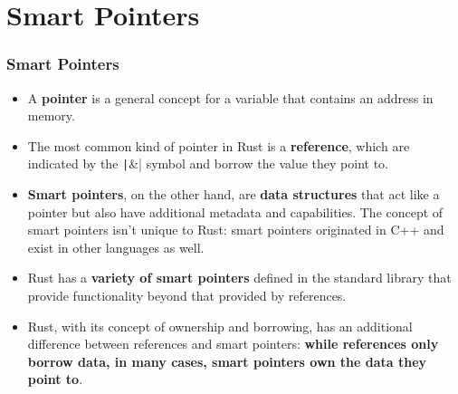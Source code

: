 \documentclass{beamer}
\begin{document}
\section{Smart Pointers}



\begin{frame}[fragile]
	\frametitle{Smart Pointers}
	\begin{itemize}
		\item A \textbf{pointer} is a general concept for a variable that contains an address in memory. 
		\item 	The most common kind of pointer in Rust is a \textbf{reference}, which are indicated by the  \texttt|&|  symbol and borrow the value they point to. 
		\item 	\textbf{Smart pointers}, on the other hand, are \textbf{data structures} that act like a pointer but also have additional metadata and capabilities. The concept of smart pointers isn’t unique to Rust: smart pointers originated in C++ and exist in other languages as well.
		\item 	Rust has a \textbf{variety of smart pointers} defined in the standard library that provide functionality beyond that provided by references.
		\item 	Rust, with its concept of ownership and borrowing, has an additional difference between references and smart pointers: \textbf{while references only borrow data, in many cases, smart pointers own the data they point to}.
	\end{itemize}
\end{frame} 
\end{document}
